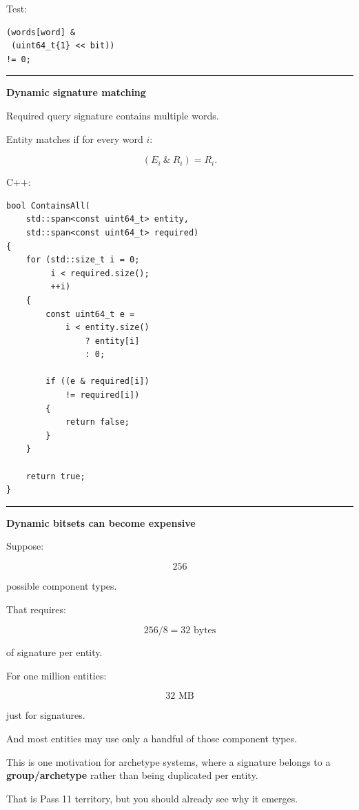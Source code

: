 Test:

\begin{verbatim}
(words[word] &
 (uint64_t{1} << bit))
!= 0;
\end{verbatim}

\begin{center}\rule{0.5\linewidth}{0.5pt}\end{center}

\textbf{Dynamic signature matching}

Required query signature contains multiple words.

Entity matches if for every word \(i\):

\[
(E_i\ \&\ R_i)=R_i.
\]

C++:

\begin{verbatim}
bool ContainsAll(
    std::span<const uint64_t> entity,
    std::span<const uint64_t> required)
{
    for (std::size_t i = 0;
         i < required.size();
         ++i)
    {
        const uint64_t e =
            i < entity.size()
                ? entity[i]
                : 0;

        if ((e & required[i])
            != required[i])
        {
            return false;
        }
    }

    return true;
}
\end{verbatim}

\begin{center}\rule{0.5\linewidth}{0.5pt}\end{center}

\textbf{Dynamic bitsets can become expensive}

Suppose:

\[
256
\]

possible component types.

That requires:

\[
256/8=32\text{ bytes}
\]

of signature per entity.

For one million entities:

\[
32\text{ MB}
\]

just for signatures.

And most entities may use only a handful of those component types.

This is one motivation for archetype systems, where a signature belongs to a \textbf{group/archetype} rather than being duplicated per entity.

That is Pass 11 territory, but you should already see why it emerges.

